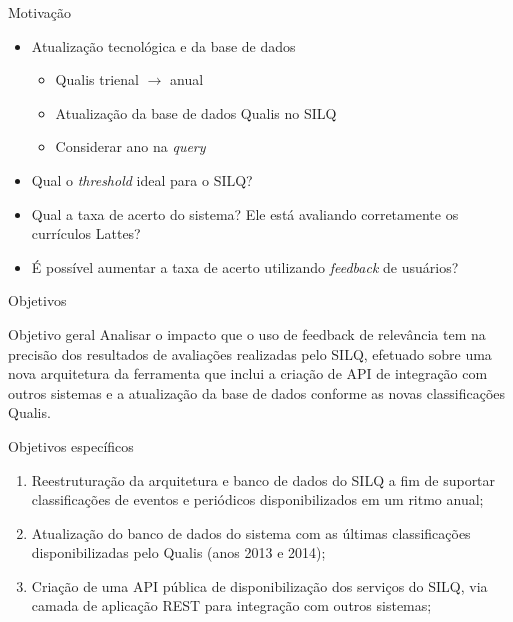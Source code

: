 \documentclass{beamer}
\begin{document}
\begin{frame}{Motivação}
  \begin{itemize}
    \item Atualização tecnológica e da base de dados
    \begin{itemize}
      \item Qualis trienal $\rightarrow$ anual
      \item Atualização da base de dados Qualis no SILQ
      \item Considerar ano na \textit{query}
    \end{itemize}

    \item Qual o \textit{threshold} ideal para o SILQ?
    \item Qual a taxa de acerto do sistema? Ele está avaliando corretamente os currículos Lattes?
    \item É possível aumentar a taxa de acerto utilizando \textit{feedback} de usuários?
  \end{itemize}
\end{frame}

\begin{frame}{Objetivos}
  \begin{block}{Objetivo geral}
    Analisar o impacto que o uso de feedback de relevância tem na precisão dos resultados de avaliações realizadas pelo SILQ, efetuado sobre uma nova arquitetura da ferramenta que inclui a criação de API de integração com outros sistemas e a atualização da base de dados conforme as novas classificações Qualis.
  \end{block}
\end{frame}

\begin{frame}{Objetivos específicos}
  \begin{enumerate}[<+->]
    \item Reestruturação da arquitetura e banco de dados do SILQ a fim de suportar classificações de eventos e periódicos disponibilizados em um ritmo anual;

    \item Atualização do banco de dados do sistema com as últimas classificações disponibilizadas pelo Qualis (anos 2013 e 2014);

    \item Criação de uma API pública de disponibilização dos serviços do SILQ, via camada de aplicação REST para integração com outros sistemas;
  \end{enumerate}
\end{frame}
\end{document}
